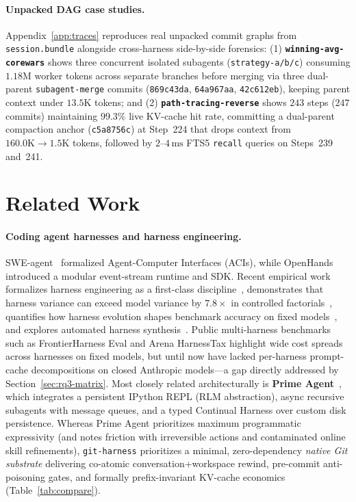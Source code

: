 \documentclass[11pt]{article}
\newcommand{\code}[1]{\nolinkurl{#1}}
\begin{document}
\paragraph{Unpacked DAG case studies.}
Appendix~\ref{app:traces} reproduces real unpacked commit graphs from \texttt{session.bundle} alongside cross-harness side-by-side forensics:
(1) \textbf{\code{winning-avg-corewars}} shows three concurrent isolated subagents (\texttt{strategy-a/b/c}) consuming $1.18\mathrm{M}$ worker tokens across separate branches before merging via three dual-parent \texttt{subagent-merge} commits (\texttt{869c43da}, \texttt{64a967aa}, \texttt{42c612eb}), keeping parent context under $13.5\mathrm{K}$ tokens; and
(2) \textbf{\code{path-tracing-reverse}} shows $243$ steps ($247$ commits) maintaining $99.3\%$ live KV-cache hit rate, committing a dual-parent compaction anchor (\texttt{c5a8756c}) at Step~224 that drops context from $160.0\mathrm{K} \to 1.5\mathrm{K}$ tokens, followed by $2\text{--}4\,\mathrm{ms}$ FTS5 \texttt{recall} queries on Steps~239 and~241.

\section{Related Work}
\label{sec:related}

\paragraph{Coding agent harnesses and harness engineering.}
SWE-agent~\citep{yang2024sweagent} formalized Agent-Computer Interfaces (ACIs), while OpenHands~\citep{wang2024openhands,openhands2025sdk} introduced a modular event-stream runtime and SDK.
Recent empirical work formalizes harness engineering as a first-class discipline~\citep{barbaste2026harness,ning2026codeasharness,guo2026survey}, demonstrates that harness variance can exceed model variance by $7.8\times$ in controlled factorials~\citep{zhang2026disclose}, quantifies how harness evolution shapes benchmark accuracy on fixed models~\citep{sghaier2026dontblame}, and explores automated harness synthesis~\citep{lou2026autoharness,lee2026metaharness,lin2026agenticharness}.
Public multi-harness benchmarks such as FrontierHarness Eval and Arena HarnessTax highlight wide cost spreads across harnesses on fixed models, but until now have lacked per-harness prompt-cache decompositions on closed Anthropic models---a gap directly addressed by Section~\ref{sec:rq3-matrix}.
Most closely related architecturally is \textbf{Prime Agent}~\citep{karten2026primeagent}, which integrates a persistent IPython REPL (RLM abstraction), async recursive subagents with message queues, and a typed Continual Harness over custom disk persistence.
Whereas Prime Agent prioritizes maximum programmatic expressivity (and notes friction with irreversible actions and contaminated online skill refinements), \texttt{git-harness} prioritizes a minimal, zero-dependency \emph{native Git substrate} delivering co-atomic conversation+workspace rewind, pre-commit anti-poisoning gates, and formally prefix-invariant KV-cache economics (Table~\ref{tab:compare}).
\end{document}
